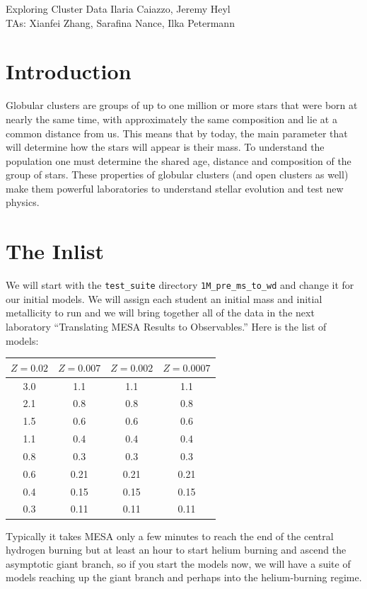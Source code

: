 \documentclass{article}
\begin{document}
\begin{titlebox}{Exploring Cluster Data}
Ilaria Caiazzo, Jeremy Heyl \\
TAs: Xianfei Zhang, Sarafina Nance, Ilka Petermann
\end{titlebox}

\section{Introduction}

Globular clusters are groups of up to one million or more stars that were born at nearly the same time, with approximately the same composition and lie at a common distance from us.  This means that by today, the main parameter that will determine how the stars will appear is their mass. To understand the population one must determine the shared age, distance and composition of the group of stars. These properties of globular clusters (and open clusters as well) make them powerful laboratories to understand stellar evolution and test new physics.

\section{The Inlist}

We will start with the \texttt{test\_suite} directory \texttt{1M\_pre\_ms\_to\_wd} and change it for our initial models.  We will assign each student an initial mass and initial metallicity to run and we will bring together all of the data in the next laboratory ``Translating MESA Results to Observables.'' Here is the list of models:

\begin{center}
\begin{tabular}{c|ccc}
\hline
$Z=0.02$ &
$Z=0.007$ &
$Z=0.002$ & 
$Z=0.0007$ 
\\  \hline 
3.0 & 1.1 & 1.1 & 1.1  \\
2.1 & 0.8 & 0.8 & 0.8  \\
1.5 & 0.6 & 0.6 & 0.6 \\
1.1 & 0.4 & 0.4 & 0.4  \\
0.8 & 0.3 & 0.3 & 0.3  \\
0.6 & 0.21 & 0.21 & 0.21 \\
0.4 & 0.15 & 0.15 & 0.15 \\
0.3 & 0.11 & 0.11 & 0.11 
\end{tabular}
\end{center}

Typically it takes MESA only a few minutes to reach the end of the central hydrogen burning but at least an hour to start helium burning and ascend the asymptotic giant branch, so if you start the models now, we will have a suite of models reaching up the giant branch and perhaps into the helium-burning regime.
\end{document}
